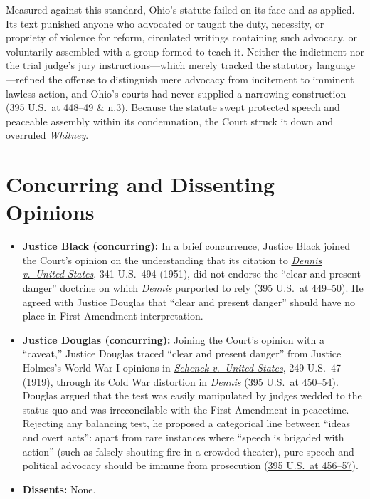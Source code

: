 \documentclass[12pt]{article}
\begin{document}
Measured against this standard, Ohio's statute failed on its face and as applied. Its text punished anyone who advocated or taught the duty, necessity, or propriety of violence for reform, circulated writings containing such advocacy, or voluntarily assembled with a group formed to teach it. Neither the indictment nor the trial judge's jury instructions---which merely tracked the statutory language---refined the offense to distinguish mere advocacy from incitement to imminent lawless action, and Ohio's courts had never supplied a narrowing construction (\href{https://supreme.justia.com/cases/federal/us/395/444/}{395 U.S.\ at 448--49 \& n.3}). Because the statute swept protected speech and peaceable assembly within its condemnation, the Court struck it down and overruled \emph{Whitney}.

\section{Concurring and Dissenting Opinions}

\begin{itemize}
  \item \textbf{Justice Black (concurring):} In a brief concurrence, Justice Black joined the Court's opinion on the understanding that its citation to \href{https://supreme.justia.com/cases/federal/us/341/494/}{\emph{Dennis v.\ United States}}, 341 U.S.\ 494 (1951), did not endorse the ``clear and present danger'' doctrine on which \emph{Dennis} purported to rely (\href{https://supreme.justia.com/cases/federal/us/395/444/}{395 U.S.\ at 449--50}). He agreed with Justice Douglas that ``clear and present danger'' should have no place in First Amendment interpretation.
  \item \textbf{Justice Douglas (concurring):} Joining the Court's opinion with a ``caveat,'' Justice Douglas traced ``clear and present danger'' from Justice Holmes's World War I opinions in \href{https://supreme.justia.com/cases/federal/us/249/47/}{\emph{Schenck v.\ United States}}, 249 U.S.\ 47 (1919), through its Cold War distortion in \emph{Dennis} (\href{https://supreme.justia.com/cases/federal/us/395/444/}{395 U.S.\ at 450--54}). Douglas argued that the test was easily manipulated by judges wedded to the status quo and was irreconcilable with the First Amendment in peacetime. Rejecting any balancing test, he proposed a categorical line between ``ideas and overt acts'': apart from rare instances where ``speech is brigaded with action'' (such as falsely shouting fire in a crowded theater), pure speech and political advocacy should be immune from prosecution (\href{https://supreme.justia.com/cases/federal/us/395/444/}{395 U.S.\ at 456--57}).
  \item \textbf{Dissents:} None.
\end{itemize}
\end{document}
